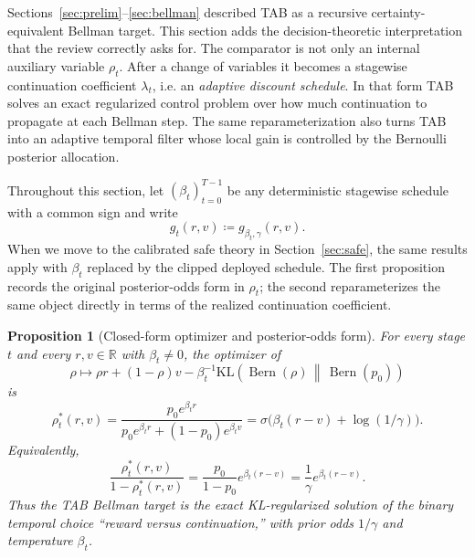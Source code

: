 \documentclass{article}
\newtheorem{proposition}[proposition]{Proposition}
\theoremstyle{remark}
\DeclareMathOperator{\Bern}{Bern}
\newcommand{\R}{\mathbb{R}}
\newcommand{\KL}{\mathrm{KL}}
\newcommand{\defeq}{\coloneqq}
\newcommand{\pprior}{p_0}
\newcommand{\KLbin}[2]{\KL\!\left(\Bern(#1)\,\middle\|\,\Bern(#2)\right)}
\begin{document}
Sections~\ref{sec:prelim}--\ref{sec:bellman} described TAB as a recursive certainty-equivalent Bellman target. This section adds the decision-theoretic interpretation that the review correctly asks for. The comparator is not only an internal auxiliary variable $\rho_t$. After a change of variables it becomes a stagewise continuation coefficient $\lambda_t$, i.e. an \emph{adaptive discount schedule}. In that form TAB solves an exact regularized control problem over how much continuation to propagate at each Bellman step. The same reparameterization also turns TAB into an adaptive temporal filter whose local gain is controlled by the Bernoulli posterior allocation.

Throughout this section, let $(\beta_t)_{t=0}^{T-1}$ be any deterministic stagewise schedule with a common sign and write
\[
 g_t(r,v) \defeq g_{\beta_t,\gamma}(r,v).
\]
When we move to the calibrated safe theory in Section~\ref{sec:safe}, the same results apply with $\beta_t$ replaced by the clipped deployed schedule. The first proposition records the original posterior-odds form in $\rho_t$; the second reparameterizes the same object directly in terms of the realized continuation coefficient.

\begin{proposition}[Closed-form optimizer and posterior-odds form]
\label{prop:ew-update}
For every stage $t$ and every $r,v\in\R$ with $\beta_t\neq 0$, the optimizer of
\[
\rho \mapsto \rho r + (1-\rho)v - \beta_t^{-1}\KLbin{\rho}{\pprior}
\]
is
\begin{equation}
\rho_t^*(r,v)=\frac{\pprior e^{\beta_t r}}{\pprior e^{\beta_t r} + (1-\pprior)e^{\beta_t v}}
=\sigma\!\bigl(\beta_t(r-v)+\log(1/\gamma)\bigr).
\label{eq:exp-weights-rho}
\end{equation}
Equivalently,
\begin{equation}
\frac{\rho_t^*(r,v)}{1-\rho_t^*(r,v)}
=\frac{\pprior}{1-\pprior}e^{\beta_t(r-v)}
=\frac{1}{\gamma}e^{\beta_t(r-v)}.
\label{eq:odds-update}
\end{equation}
Thus the TAB Bellman target is the exact KL-regularized solution of the binary temporal choice ``reward versus continuation,'' with prior odds $1/\gamma$ and temperature $\beta_t$.
\end{proposition}
\end{document}
